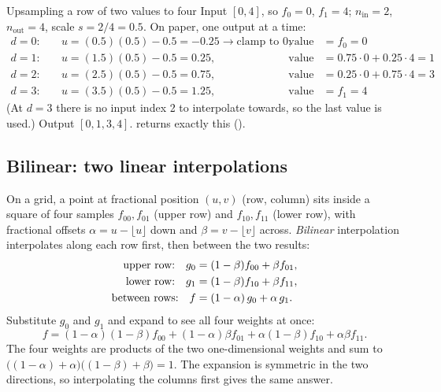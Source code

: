 \begin{worked}[label={we:decoder:lerp}]{Upsampling a row of two values to four}
Input $[0, 4]$, so $f_0 = 0$, $f_1 = 4$; $n_{\text{in}} = 2$, $n_{\text{out}} = 4$, scale $s = 2/4 =
0.5$. On paper, one output at a time:
\begin{align*}
d = 0:&\quad u = (0.5)(0.5) - 0.5 = -0.25 \to \text{clamp to } 0, & \text{value} &= f_0 = 0\\
d = 1:&\quad u = (1.5)(0.5) - 0.5 = 0.25, & \text{value} &= 0.75 \cdot 0 + 0.25 \cdot 4 = 1\\
d = 2:&\quad u = (2.5)(0.5) - 0.5 = 0.75, & \text{value} &= 0.25 \cdot 0 + 0.75 \cdot 4 = 3\\
d = 3:&\quad u = (3.5)(0.5) - 0.5 = 1.25, & \text{value} &= f_1 = 4
\end{align*}
(At $d = 3$ there is no input index 2 to interpolate towards, so the last value is used.)
Output $[0, 1, 3, 4]$.  returns exactly this
().
\end{worked}

\subsection{Bilinear: two linear interpolations}

On a grid, a point at fractional position $(u, v)$ (row, column) sits inside a square of four samples
$f_{00}, f_{01}$ (upper row) and $f_{10}, f_{11}$ (lower row), with fractional offsets $\alpha = u -
\lfloor u \rfloor$ down and $\beta = v - \lfloor v \rfloor$ across. \emph{Bilinear}
interpolation interpolates along each row first, then between the two results:
\begin{align}
\text{upper row:}\quad g_0 &= (1 - \beta) f_{00} + \beta f_{01},\notag\\
\text{lower row:}\quad g_1 &= (1 - \beta) f_{10} + \beta f_{11},\notag\\
\text{between rows:}\quad f &= (1 - \alpha)\, g_0 + \alpha\, g_1 .\label{eq:decoder:bilinear}
\end{align}
Substitute $g_0$ and $g_1$ and expand to see all four weights at once:
\[
f = (1-\alpha)(1-\beta) f_{00} + (1-\alpha)\beta f_{01} + \alpha(1-\beta) f_{10} + \alpha\beta f_{11} .
\]
The four weights are products of the two one-dimensional weights and sum to $\big((1-\alpha)+\alpha\big)
\big((1-\beta)+\beta\big) = 1$. The expansion is symmetric in the two directions, so interpolating the
columns first gives the same answer.

